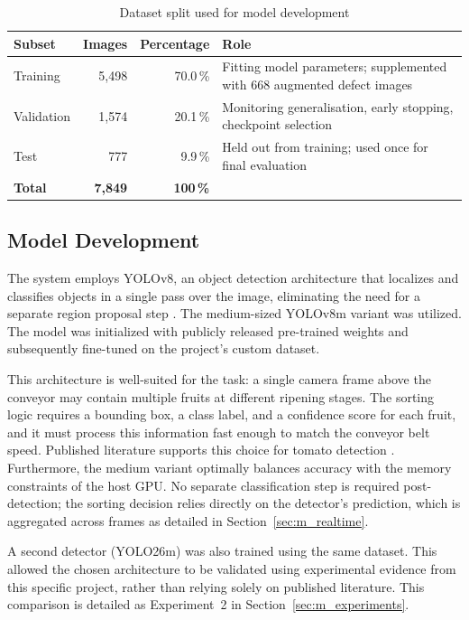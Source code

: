 \begin{table}[H]
\caption{Dataset split used for model development}
\label{tab:split}
\centering
\begin{tabularx}{\textwidth}{l r r X}
\toprule
\textbf{Subset} & \textbf{Images} & \textbf{Percentage} & \textbf{Role} \\
\midrule
Training   & 5{,}498 & 70.0\,\% & Fitting model parameters; supplemented with 668 augmented defect images \\
Validation & 1{,}574 & 20.1\,\% & Monitoring generalisation, early stopping, checkpoint selection \\
Test       & 777   & 9.9\,\%  & Held out from training; used once for final evaluation \\
\midrule
\textbf{Total} & \textbf{7{,}849} & \textbf{100\,\%} & \\
\bottomrule
\end{tabularx}
\end{table}

\subsection{Model Development}
\label{sec:m_model}

The system employs YOLOv8, an object detection architecture that localizes and classifies objects in a single pass over the image, eliminating the need for a separate region proposal step \citep{redmon2016, terven2023}. The medium-sized YOLOv8m variant was utilized. The model was initialized with publicly released pre-trained weights and subsequently fine-tuned on the project's custom dataset.

This architecture is well-suited for the task: a single camera frame above the conveyor may contain multiple fruits at different ripening stages. The sorting logic requires a bounding box, a class label, and a confidence score for each fruit, and it must process this information fast enough to match the conveyor belt speed. Published literature supports this choice for tomato detection \citep{safira2026}. Furthermore, the medium variant optimally balances accuracy with the memory constraints of the host \acrshort{GPU}. No separate classification step is required post-detection; the sorting decision relies directly on the detector's prediction, which is aggregated across frames as detailed in Section~\ref{sec:m_realtime}.

A second detector (YOLO26m) was also trained using the same dataset. This allowed the chosen architecture to be validated using experimental evidence from this specific project, rather than relying solely on published literature. This comparison is detailed as Experiment~2 in Section~\ref{sec:m_experiments}.

